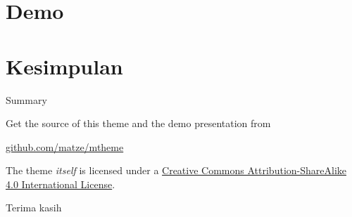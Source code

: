 \documentclass[10pt]{beamer}
\newcommand{\themename}{\textbf{\textsc{metropolis}}\xspace}
\begin{document}
\section{Demo}

\section{Kesimpulan}

\begin{frame}{Summary}

    Get the source of this theme and the demo presentation from

    \begin{center}\url{github.com/matze/mtheme}\end{center}

    The theme \emph{itself} is licensed under a
    \href{http://creativecommons.org/licenses/by-sa/4.0/}{Creative Commons
    Attribution-ShareAlike 4.0 International License}.

    \begin{center}\ccbysa\end{center}

\end{frame}

\begin{frame}[standout]
    Terima kasih
\end{frame}

\appendix





%     
%     

\end{document}
